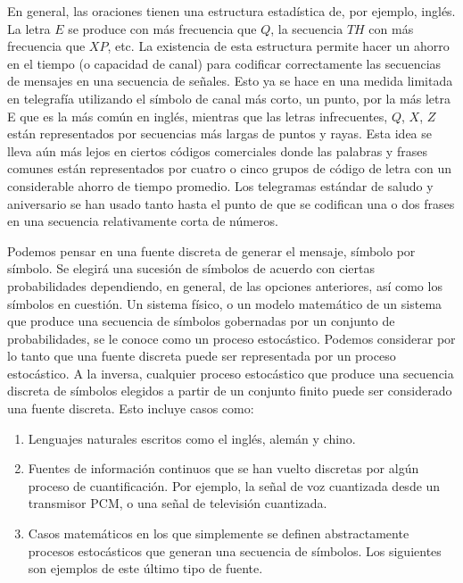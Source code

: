 En general, las oraciones tienen una estructura estad\'istica de, por
ejemplo, ingl\'es. La letra $E$ se produce con m\'as frecuencia que
$Q$, la secuencia $TH$ con m\'as frecuencia que $XP$, etc. La
existencia de esta estructura permite hacer un ahorro en el tiempo (o
capacidad de canal) para codificar correctamente las secuencias de
mensajes en una secuencia de se\~nales. Esto ya se hace en una medida
limitada en telegraf\'ia utilizando el s\'imbolo de canal m\'as corto,
un punto, por la m\'as letra E que es la m\'as com\'un en ingl\'es,
mientras que las letras infrecuentes, $Q$, $X$, $Z$ est\'an
representados por secuencias m\'as largas de puntos y rayas. Esta idea
se lleva a\'un m\'as lejos en ciertos c\'odigos comerciales donde las
palabras y frases comunes est\'an representados por cuatro o cinco
grupos de c\'odigo de letra con un considerable ahorro de tiempo
promedio.  Los telegramas est\'andar de saludo y aniversario se han
usado tanto hasta el punto de que se codifican una o dos frases en una
secuencia relativamente corta de n\'umeros.

Podemos pensar en una fuente discreta de generar el mensaje, s\'imbolo
por s\'imbolo. Se elegir\'a una sucesi\'on de s\'imbolos de acuerdo
con ciertas probabilidades dependiendo, en general, de las opciones
anteriores, as\'i como los s\'imbolos en cuesti\'on. Un sistema
f\'isico, o un modelo matem\'atico de un sistema que produce una
secuencia de s\'imbolos gobernadas por un conjunto de probabilidades,
se le conoce como un proceso estoc\'astico.  Podemos considerar por lo
tanto que una fuente discreta puede ser representada por un proceso
estoc\'astico. A la inversa, cualquier proceso estoc\'astico que
produce una secuencia discreta de s\'imbolos elegidos a partir de un
conjunto finito puede ser considerado una fuente discreta. Esto
incluye casos como:

\begin{enumerate}
\item{Lenguajes naturales escritos como el ingl\'es, alem\'an y chino.}

\item{Fuentes de informaci\'on continuos que se han vuelto discretas por
alg\'un proceso de cuantificaci\'on. Por ejemplo, la se\~nal de voz
cuantizada desde un transmisor PCM, o una se\~nal de televisi\'on
cuantizada.}

\item{Casos matem\'aticos en los que simplemente se definen abstractamente
procesos estoc\'asticos que generan una secuencia de s\'imbolos. Los
siguientes son ejemplos de este \'ultimo tipo de fuente.}
\end{enumerate}

